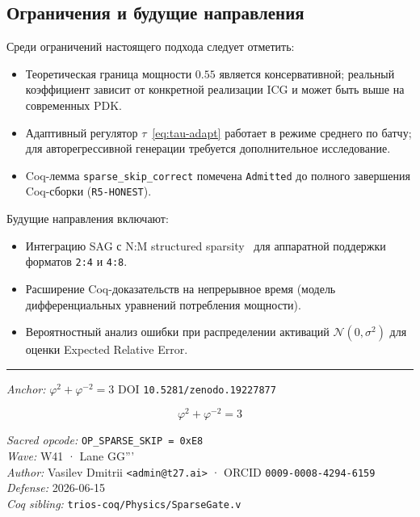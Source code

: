 \subsection{Ограничения и будущие направления}
\label{ssec:glava87-limitations}

Среди ограничений настоящего подхода следует отметить:
\begin{itemize}
  \item Теоретическая граница мощности $0{.}55$ является консервативной;
        реальный коэффициент зависит от конкретной реализации ICG
        и может быть выше на современных PDK.
  \item Адаптивный регулятор $\tau$~\eqref{eq:tau-adapt} работает
        в режиме среднего по батчу; для авторегрессивной генерации
        требуется дополнительное исследование.
  \item Coq-лемма \texttt{sparse\_skip\_correct} помечена \texttt{Admitted}
        до полного завершения Coq-сборки (\texttt{R5-HONEST}).
\end{itemize}

Будущие направления включают:
\begin{itemize}
  \item Интеграцию SAG с N:M structured sparsity~\cite{hoefler2021sparsity}
        для аппаратной поддержки форматов \texttt{2:4} и \texttt{4:8}.
  \item Расширение Coq-доказательств на непрерывное время (модель
        дифференциальных уравнений потребления мощности).
  \item Вероятностный анализ ошибки при распределении активаций
        $\mathcal{N}(0, \sigma^2)$ для оценки Expected Relative Error.
\end{itemize}

\bigskip
\noindent\rule{\textwidth}{0.4pt}

\noindent\textit{Anchor: } $\varphi^{2} + \varphi^{-2} = 3$ \quad DOI
\texttt{10.5281/zenodo.19227877}

\[
  \varphi^{2} + \varphi^{-2} = 3
\]

\noindent\textit{Sacred opcode:} \texttt{OP\_SPARSE\_SKIP = 0xE8} \\
\noindent\textit{Wave:} W41 · Lane GG''' \\
\noindent\textit{Author:} Vasilev Dmitrii \texttt{<admin@t27.ai>}
· ORCID \texttt{0009-0008-4294-6159} \\
\noindent\textit{Defense:} 2026-06-15 \\
\noindent\textit{Coq sibling:} \texttt{trios-coq/Physics/SparseGate.v}

